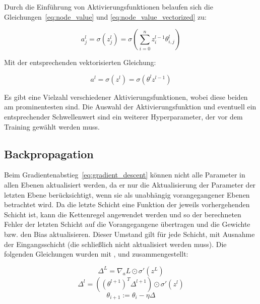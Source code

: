 Durch die Einführung von Aktivierungsfunktionen belaufen sich die Gleichungen~\eqref{eq:node_value} und \eqref{eq:node_value_vectorized} zu:

\begin{equation}
    a^l_j = \sigma(z^l_j) = \sigma(\sum^n_{i=0}z^{l-1}_i\theta^l_{i, j})
    \label{eq:activation}
\end{equation}

Mit der entsprechenden vektorisierten Gleichung:

\begin{equation}
    a^l = \sigma(z^l) = \sigma(\theta^l z^{l-1})
    \label{eq:activation_vectorized}
\end{equation}

Es gibt eine Vielzahl verschiedener Aktivierungsfunktionen, wobei diese beiden am prominentesten sind.
Die Auswahl der Aktivierungsfunktion und eventuell ein entsprechender Schwellenwert sind ein weiterer Hyperparameter, der vor dem Training gewählt werden muss.

\subsection{Backpropagation}

Beim Gradientenabstieg~\eqref{eq:gradient_descent} können nicht alle Parameter in allen Ebenen aktualisiert werden, da er nur die Aktualisierung der Parameter der letzten Ebene berücksichtigt, wenn sie als unabhängig vorangegangener Ebenen betrachtet wird.
Da die letzte Schicht eine Funktion der jeweils vorhergehenden Schicht ist, kann die Kettenregel angewendet werden und so der berechneten Fehler der letzten Schicht auf die Vorangegangene übertragen und die Gewichte bzw. den Bias aktualisieren. Dieser Umstand gilt für jede Schicht, mit Ausnahme der Eingangsschicht (die schließlich nicht aktualisiert werden muss).
Die folgenden Gleichungen wurden mit \cite[S.733]{StuartRussell2018}, \cite[S.197]{Goodfellow2017} und \cite[ch.2]{Nielsen2015} zusammengestellt:

\begin{equation}
    \varDelta^L = \nabla_a L \odot \sigma'(z^L)
    \label{eq:output_error}
\end{equation}
\begin{equation}
    \varDelta^l = ((\theta^{l+1})^T \varDelta^{l+1}) \odot \sigma'(z^l)
    \label{eq:hidden_error}
\end{equation}
\begin{equation}
    \theta_{i+1} := \theta_i - \eta \varDelta
    \label{eq:backprop_update}
\end{equation}

